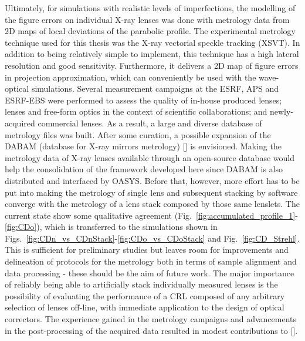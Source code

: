 \begin{refsection}
Ultimately, for simulations with realistic levels of imperfections, the modelling of the figure errors on individual X-ray lenses was done with metrology data from 2D maps of local deviations of the parabolic profile. The experimental metrology technique used for this thesis was the X-ray vectorial speckle tracking (XSVT). In addition to being relatively simple to implement, this technique has a high lateral resolution and good sensitivity. Furthermore, it delivers a 2D map of figure errors in projection approximation, which can conveniently be used with the wave-optical simulations. 
Several measurement campaigns at the ESRF, APS and ESRF-EBS were performed to assess the quality of in-house produced lenses; lenses and free-form optics in the context of scientific collaborations; and newly-acquired commercial lenses. As a result, a large and diverse database of metrology files was built. After some curation, a possible expansion of the DABAM (database for X-ray mirrors metrology) [\cite{SanchezDelRio2016}] is envisioned. Making the metrology data of X-ray lenses available through an open-source database would help the consolidation of the framework developed here since DABAM is also distributed and interfaced by OASYS. Before that, however, more effort has to be put into making the metrology of single lens and subsequent stacking by software converge with the metrology of a lens stack composed by those same lenslets. The current state show some qualitative agreement (Fig.~\ref{fig:accumulated_profile_1}-\ref{fig:CDo}), which is transferred to the simulations shown in Figs.~\ref{fig:CDn_vs_CDnStack}-\ref{fig:CDo_vs_CDoStack} and Fig.~\ref{fig:CD_Strehl}. This is sufficient for preliminary studies but leaves room for improvements and delineation of protocols for the metrology both in terms of sample alignment and data processing - these should be the aim of future work. The major importance of reliably being able to artificially stack individually measured lenses is the possibility of evaluating the performance of a CRL composed of any arbitrary selection of lenses off-line, with immediate application to the design of optical correctors. The experience gained in the metrology campaigns and advancements in the post-processing of the acquired data resulted in modest contributions to [\cite{Berujon2020a,Berujon2020,Qiao2020b}].


\end{refsection}

